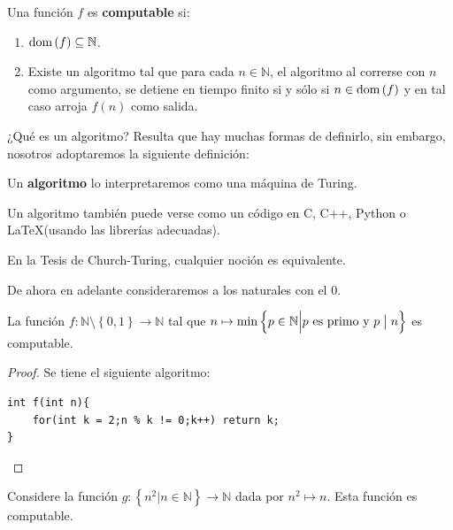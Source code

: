 \documentclass[12pt]{report}
\newcounter{it}
\theoremstyle{largebreak}
\newcommand\divides{\ensuremath{\bigm|}}
\newcommand\cf[3]{\ensuremath{#1:#2\rightarrow#3}}
\newcommand{\dom}[1]{\textup{dom}\left(#1 \right)}
\begin{document}
    \begin{mydef}
        Una función $f$ es \textbf{computable} si:
        \begin{enumerate}[label = \textit{(\arabic*)}]
            \item $\dom{f}\subseteq\mathbb{N}$.
            \item Existe un algoritmo tal que para cada $n\in\mathbb{N}$, el algoritmo al correrse con $n$ como argumento, se detiene en tiempo finito si y sólo si $n\in\dom{f}$ y en tal caso arroja $f(n)$ como salida. 
        \end{enumerate}
    \end{mydef}

    ¿Qué es un algoritmo? Resulta que hay muchas formas de definirlo, sin embargo, nosotros adoptaremos la siguiente definición:

    \begin{mydef}
        Un \textbf{algoritmo} lo interpretaremos como una máquina de Turing.
    \end{mydef}

    \begin{obs}
        Un algoritmo también puede verse como un código en C, C++, Python o \LaTeX (usando las librerías adecuadas).
    \end{obs}

    En la Tesis de Church-Turing, cualquier noción es equivalente.

    \begin{obs}
        De ahora en adelante consideraremos a los naturales con el 0.
    \end{obs}

    \begin{exa}
        La función $\cf{f}{\mathbb{N}\setminus\left\{0,1\right\}}{\mathbb{N}}$ tal que $n\mapsto\min\left\{p\in\mathbb{N}\Big|p\textup{ es primo y }p\divides n \right\}$ es computable.
    \end{exa}

    \begin{proof}
        Se tiene el siguiente algoritmo:
        \begin{lstlisting}
int f(int n){
    for(int k = 2;n % k != 0;k++) return k;
}
        \end{lstlisting}
    \end{proof}

    \begin{exa}
        Considere la función $\cf{g}{\left\{n^2\Big|n\in\mathbb{N} \right\}}{\mathbb{N}}$ dada por $n^2\mapsto n$. Esta función es computable.
    \end{exa}
\end{document}
